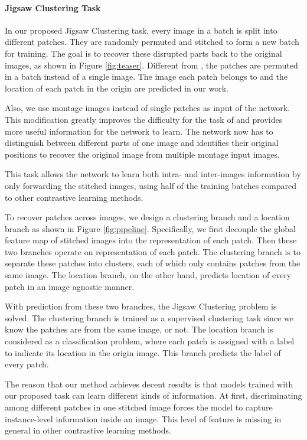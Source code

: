 \documentclass[final]{cvpr}
\begin{document}
\paragraph{Jigsaw Clustering Task} In our proposed Jigsaw Clustering task, every image in a batch is split into different patches. They are randomly permuted and stitched to form a new batch for training. The goal is to recover these disrupted parts back to the original images, as shown in Figure \ref{fig:teaser}. Different from \cite{jigpuz}, the patches are permuted in a batch instead of a single image. The image each patch belongs to and the location of each patch in the origin are predicted in our work. 

Also, we use montage images instead of single patches as input of the network.
This modification greatly improves the difficulty for the task of \cite{jigpuz} and provides more useful information for the network to learn. The network now has to distinguish between different parts of one image and identifies their original positions to recover the original image from multiple montage input images. 

This task allows the network to learn both intra- and inter-images information by only forwarding the stitched images, using half of the training batches compared to other contrastive learning methods. 

To recover patches across images, we design a clustering branch and a location branch as shown in Figure \ref{fig:pipeline}. Specifically, we first decouple the global feature map of stitched images into the representation of each patch. Then these two branches operate on representation of each patch. The clustering branch is to separate these patches into clusters, each of which only contains patches from the same image. The location branch, on the other hand, predicts location of every patch in an image agnostic manner. 

With prediction from these two branches, the Jigsaw Clustering problem is solved. The clustering branch is trained as a supervised clustering task since we know the patches are from the same image, or not. The location branch is considered as a classification problem, where each patch is assigned with a label to indicate its location in the origin image. This branch predicts the label of every patch. 

The reason that our method achieves decent results is that models trained with our proposed task can learn different kinds of information. At first, discriminating among different patches in one stitched image forces the model to capture instance-level information inside an image. This level of feature is missing in general in other contrastive learning methods.
\end{document}

